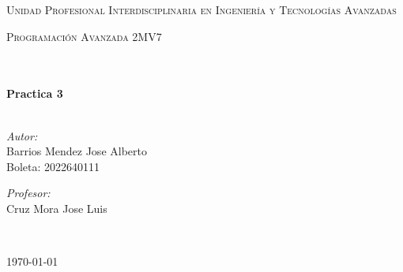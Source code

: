 \documentclass[12pt]{article}
\begin{document}
\begin{center}
\textsc{\LARGE Unidad Profesional Interdisciplinaria en Ingenier\'ia y				%
Tecnolog\'ias Avanzadas}\\[1.5cm]													%

\begin{minipage}{0.9\textwidth} 
\begin{center}																					%
\textsc{\LARGE Programación Avanzada 2MV7}
\end{center}
\end{minipage}\\[0.5cm]
 			\vspace*{1cm}																		%
\HRule \\[0.4cm]																	%
{ \huge \bfseries Practica 3}\\[0.4cm]	%
\HRule \\[1.5cm]																	%
\begin{minipage}{0.46\textwidth}													%
\begin{flushleft} \large															%
\emph{Autor:}\\	
Barrios Mendez Jose Alberto\\
Boleta: 2022640111


\end{flushleft}																		%
\end{minipage}		
\begin{minipage}{0.52\textwidth}		
\vspace{-0.6cm}											%
\begin{flushright} \large															%
\emph{Profesor:} \\																	%
Cruz Mora Jose Luis\\
\end{flushright}																	%
\end{minipage}	
\vspace*{1cm}
 	
 		\\																		%
\vspace{2cm} 																				
\begin{center}																					
{\large \today}																	%
 			\end{center}												  						
\end{center}							 											
																					
\end{document}
